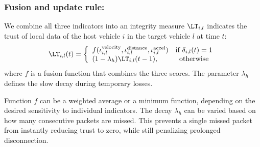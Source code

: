 \subsubsection{Fusion and update rule:}
We combine all three indicators into an integrity measure $\LT_{i,l}$ indicates the trust of local data of the host vehicle $i$ in the target vehicle $l$ at time $t$:
\begin{equation}
    \LT_{i,l}(t) = 
    \left\{ \begin{array}{lc}
        f (\iota_{i,l}^{\text{velocity}}, \iota_{i,l}^{\text{distance}} ,\iota_{i,l}^{\text{accel}})  &  \text{if } \delta_{i,l}(t) = 1 \\
        (1 - \lambda_h)\LT_{i,l}(t-1), & \text{otherwise}
    \end{array}\right.
\end{equation}
where $f$ is a fusion function that combines the three scores.
The parameter $\lambda_h$ defines the slow decay during temporary losses.
\begin{remark}
    Function $f$ can be a weighted average or a minimum function, depending on the desired sensitivity to individual indicators.
    The decay $\lambda_h$ can be varied based on how many consecutive packets are missed.
    This prevents a single missed packet from instantly reducing trust to zero, while still penalizing prolonged disconnection.
\end{remark}

